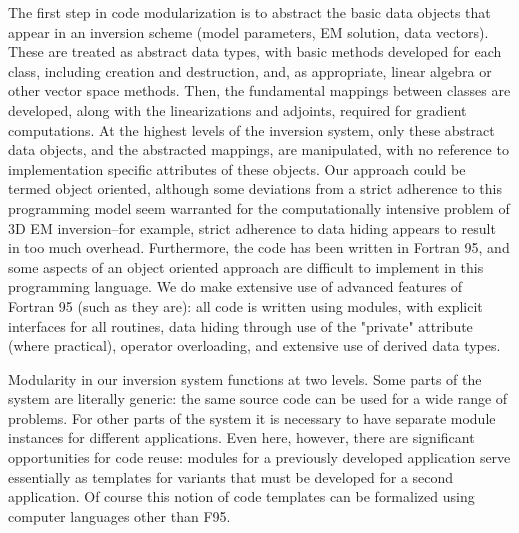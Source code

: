 The first step in code modularization 
is to abstract the basic data objects that appear
in an inversion scheme (model parameters, EM solution, data vectors).
These are treated as abstract data types, with basic
methods developed for each class, including creation and destruction, 
and, as appropriate, linear algebra or other vector space methods.
Then, the fundamental mappings between classes are developed, along
with the linearizations and adjoints, required for gradient
computations.
At the highest levels of the inversion system, only these abstract
data objects, and the abstracted mappings, are manipulated,
with no reference to implementation specific
attributes of these objects.  
Our approach could be termed object oriented,
although some deviations from a strict adherence to
this programming model seem warranted for
the computationally intensive problem of 3D EM inversion--for example,
strict adherence to data hiding appears to result
in too much overhead.  
Furthermore, the code has been written in Fortran 95,
and some aspects of an object oriented approach are difficult to
implement in this programming language.
We do make extensive use of advanced features 
of Fortran 95 (such as they are):
all code is written using modules, 
with explicit interfaces for all routines,
data hiding through use of the "private" attribute (where practical),
operator overloading, and extensive use of derived data types.

Modularity in our inversion system functions at two levels.
Some parts of the system are literally generic: the same
source code can be used for a wide range of problems.  For other
parts of the system
it is necessary to have separate module instances
for different applications.   Even here, however,
there are significant opportunities for code reuse: modules
for a previously developed application serve essentially as 
templates for variants that must be developed for a second application.
Of course this notion of code templates can be formalized
using computer languages other than F95.

